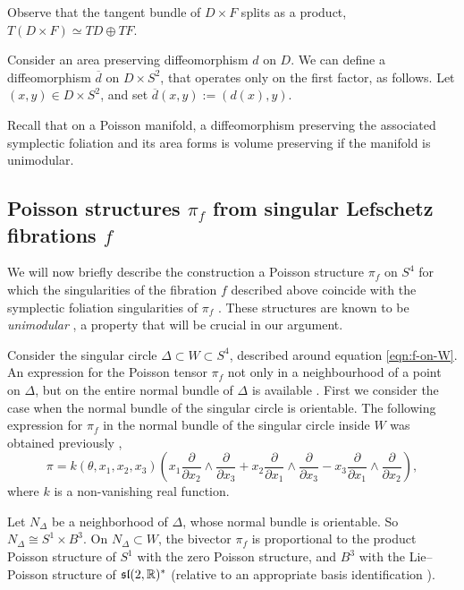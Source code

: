 \documentclass{amsart}
\begin{document}
Observe that the tangent bundle of $D\times F$ splits as a product, $T(D\times F)\simeq TD\oplus TF$.

Consider an area preserving diffeomorphism $d$ on $D$. We can define a diffeomorphism $\overline{d}$ on $D\times S^2$, that operates only on the first factor, as follows.
Let $(x,y)\in D\times S^2$, and set  $\overline{d}(x,y):=(d(x), y)$.
 
Recall that on a Poisson manifold, a diffeomorphism preserving the associated symplectic foliation and its area forms is volume preserving if the manifold is unimodular.


\subsection*{Poisson structures $\pi_{f}$ from singular Lefschetz fibrations $f$}

We will now briefly describe the construction a Poisson structure $\pi_{f}$ on $S^4$ for which the singularities of the fibration $f$ described above coincide with the symplectic foliation singularities of $\pi_{f}$ \cite[Theorem 1.1]{GSV15}. 
These structures are known to be {\it unimodular} \cite{BV21}, a property that will be crucial in our argument. 
% 

Consider the singular circle $\Delta\subset W\subset S^4$, described around equation \eqref{eqn:f-on-W}.  
An expression for the Poisson tensor $\pi_{f}$ not only in a neighbourhood of a point on $\Delta$, but on the entire normal bundle of $\Delta$ is available \cite{GSV15}.
First we consider the case when the normal bundle of the singular circle is orientable.  
The following expression for $\pi_{f}$  in the normal
bundle of the singular circle inside $W$  was obtained previously \cite[Equation 3.4]{GSV15},
\begin{equation} \label{eq:pi-gamma}
\pi=k(\theta,x_1,x_2,x_3)\left (x_1 \frac{\partial}{\partial x_2} \wedge \frac{\partial}{\partial x_3} + x_2 \frac{\partial}{\partial x_1} \wedge \frac{\partial}{\partial x_3} - x_3 \frac{\partial}{\partial x_1} \wedge \frac{\partial}{\partial x_2} \right ),
\end{equation}
where $k$ is a non-vanishing real function.

Let $N_{\Delta}$ be a neighborhood of $\Delta$, whose normal bundle is orientable. So $N_{\Delta}\cong S^1\times B^3$. On $N_{\Delta}\subset W$, the bivector $\pi_{f}$  is proportional to the product Poisson structure of  $S^1$ with the 
zero Poisson structure, and $B^3$ with the Lie--Poisson structure of $\frak{sl}(2,\mathbb{R})^*$ (relative to an appropriate basis identification \cite{GSV15}).
\end{document}

